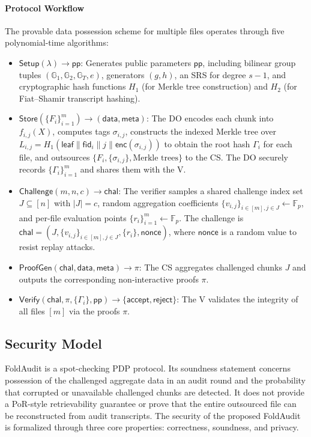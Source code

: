\documentclass[lettersize,journal]{IEEEtran}
\newcommand{\GG}{\mathbb{G}}
\newcommand{\FF}{\mathbb{F}}
\newcommand{\Setup}{\mathsf{Setup}}
\newcommand{\Store}{\mathsf{Store}}
\newcommand{\Chal}{\mathsf{Challenge}}
\newcommand{\ProofGen}{\mathsf{ProofGen}}
\newcommand{\Verify}{\mathsf{Verify}}
\begin{document}
\paragraph{Protocol Workflow}
The provable data possession scheme for multiple files operates through five polynomial-time algorithms:
\begin{itemize}
    \item $\Setup(\lambda) \to \mathsf{pp}$: Generates public parameters $\mathsf{pp}$, including bilinear group tuples $(\GG_1, \GG_2, \GG_T, e)$, generators $(g,h)$, an SRS for degree $s-1$, and cryptographic hash functions $H_1$ (for Merkle tree construction) and $H_2$ (for Fiat--Shamir transcript hashing).
    \item $\Store(\{F_i\}_{i=1}^m) \to (\mathsf{data}, \mathsf{meta})$: The DO encodes each chunk into $f_{i,j}(X)$, computes tags $\sigma_{i,j}$, constructs the indexed Merkle tree over $L_{i,j}=H_1(\mathsf{leaf}\|\mathsf{fid}_i\|j\|\mathsf{enc}(\sigma_{i,j}))$ to obtain the root hash $\Gamma_i$ for each file, and outsources $\{F_i, \{\sigma_{i,j}\}, \text{Merkle trees}\}$ to the CS. The DO securely records $\{\Gamma_i\}_{i=1}^m$ and shares them with the V.
    \item $\Chal(m,n,c) \to \mathsf{chal}$: The verifier samples a shared challenge index set $J \subseteq [n]$ with $|J| = c$, random aggregation coefficients $\{v_{i,j}\}_{i\in[m], j \in J} \leftarrow \FF_p$, and per-file evaluation points $\{r_i\}_{i=1}^m \leftarrow \FF_p$. The challenge is $\mathsf{chal} = (J, \{v_{i,j}\}_{i\in[m],j\in J}, \{r_i\}, \mathsf{nonce})$, where $\mathsf{nonce}$ is a random value to resist replay attacks.
    \item $\ProofGen(\mathsf{chal}, \mathsf{data}, \mathsf{meta}) \to \pi$: The CS aggregates challenged chunks $J$ and outputs the corresponding non-interactive proofs $\pi$.
    \item $\Verify(\mathsf{chal}, \pi, \{\Gamma_i\}, \mathsf{pp}) \to \{\mathsf{accept}, \mathsf{reject}\}$: The V validates the integrity of all files $[m]$ via the proofs $\pi$.
\end{itemize}


\subsection{Security Model}
\label{sec:security_model}
FoldAudit is a spot-checking PDP protocol. Its soundness statement concerns possession of the challenged aggregate data in an audit round and the probability that corrupted or unavailable challenged chunks are detected. 
It does not provide a PoR-style retrievability guarantee or prove that the entire outsourced file can be reconstructed from audit transcripts.
The security of the proposed FoldAudit is formalized through three core properties: correctness, soundness, and privacy.
\end{document}
